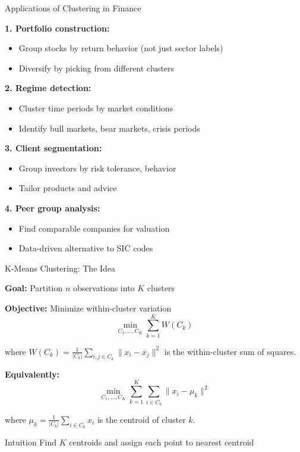 \documentclass[10pt]{beamer}
\begin{document}
\begin{frame}{Applications of Clustering in Finance}

  \textbf{1. Portfolio construction:}
  \begin{itemize}
    \item Group stocks by return behavior (not just sector labels)
    \item Diversify by picking from different clusters
  \end{itemize}

  \vspace{0.5em}
  \textbf{2. Regime detection:}
  \begin{itemize}
    \item Cluster time periods by market conditions
    \item Identify bull markets, bear markets, crisis periods
  \end{itemize}

  \vspace{0.5em}
  \textbf{3. Client segmentation:}
  \begin{itemize}
    \item Group investors by risk tolerance, behavior
    \item Tailor products and advice
  \end{itemize}

  \vspace{0.5em}
  \textbf{4. Peer group analysis:}
  \begin{itemize}
    \item Find comparable companies for valuation
    \item Data-driven alternative to SIC codes
  \end{itemize}
\end{frame}


\begin{frame}{K-Means Clustering: The Idea}

  \textbf{Goal:} Partition $n$ observations into $K$ clusters

  \vspace{1em}
  \textbf{Objective:} Minimize within-cluster variation
  \[
  \min_{C_1, \ldots, C_K} \sum_{k=1}^{K} W(C_k)
  \]

  where $W(C_k) = \frac{1}{|C_k|} \sum_{i, j \in C_k} \|x_i - x_j\|^2$ is the within-cluster sum of squares.

  \vspace{1em}
  \textbf{Equivalently:}
  \[
  \min_{C_1, \ldots, C_K} \sum_{k=1}^{K} \sum_{i \in C_k} \|x_i - \mu_k\|^2
  \]

  where $\mu_k = \frac{1}{|C_k|} \sum_{i \in C_k} x_i$ is the centroid of cluster $k$.

  \vspace{0.5em}
  \begin{block}{Intuition}
    Find $K$ centroids and assign each point to nearest centroid
  \end{block}
\end{frame}
\end{document}
